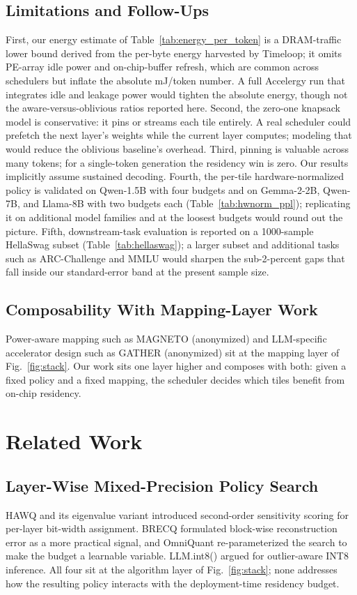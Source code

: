 \documentclass{ieeeaccess}
\begin{document}
\subsection{Limitations and Follow-Ups}
\label{sec:limitations}
First, our energy estimate of Table~\ref{tab:energy_per_token} is a
DRAM-traffic lower bound derived from the per-byte energy harvested by
Timeloop; it omits PE-array idle power and on-chip-buffer refresh,
which are common across schedulers but inflate the absolute mJ/token
number. A full Accelergy run that integrates idle and leakage power
would tighten the absolute energy, though not the aware-versus-oblivious
ratios reported here. Second, the zero-one knapsack
model is conservative: it pins or streams each tile entirely. A real
scheduler could prefetch the next layer's weights while the current
layer computes; modeling that would reduce the oblivious baseline's
overhead. Third, pinning is valuable across many tokens; for a
single-token generation the residency win is zero. Our results
implicitly assume sustained decoding. Fourth, the per-tile
hardware-normalized policy is validated on Qwen-1.5B with four budgets
and on Gemma-2-2B, Qwen-7B, and Llama-8B with two budgets each
(Table~\ref{tab:hwnorm_ppl}); replicating it on additional model
families and at the loosest budgets would round out the picture.
Fifth, downstream-task evaluation is reported on a 1000-sample
HellaSwag subset (Table~\ref{tab:hellaswag}); a larger subset and
additional tasks such as ARC-Challenge and MMLU would sharpen the
sub-2-percent gaps that fall inside our standard-error band at the
present sample size.

\subsection{Composability With Mapping-Layer Work}
Power-aware mapping such as MAGNETO (anonymized) and LLM-specific
accelerator design such as GATHER (anonymized) sit at the mapping
layer of Fig.~\ref{fig:stack}. Our work sits one layer higher and
composes with both: given a fixed policy and a fixed mapping, the
scheduler decides which tiles benefit from on-chip residency.

\section{Related Work}
\label{sec:related}

\subsection{Layer-Wise Mixed-Precision Policy Search}
HAWQ \cite{dong2019hawq} and its eigenvalue variant
\cite{dong2020hawqv2} introduced second-order sensitivity scoring for
per-layer bit-width assignment. BRECQ \cite{li2021brecq} formulated
block-wise reconstruction error as a more practical signal, and
OmniQuant \cite{shao2024omniquant} re-parameterized the search to make
the budget a learnable variable. LLM.int8() \cite{dettmers2022llmint8}
argued for outlier-aware INT8 inference. All four sit at the algorithm
layer of Fig.~\ref{fig:stack}; none addresses how the resulting policy
interacts with the deployment-time residency budget.
\end{document}
